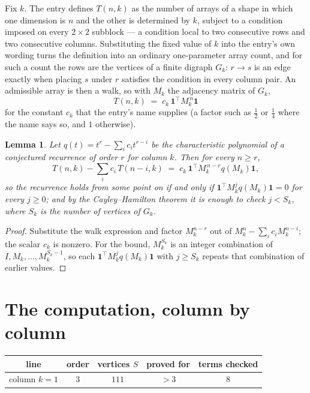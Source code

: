 \documentclass[11pt,a4paper]{article}
\theoremstyle{plain}
\newtheorem{lemma}[theorem]{Lemma}
\theoremstyle{definition}
\begin{document}
Fix $k$. The entry defines $T(n,k)$ as the number of arrays of a shape in which one dimension
is $n$ and the other is determined by $k$, subject to a condition imposed on every
$2\times2$ subblock --- a condition local to two consecutive rows and two consecutive columns.
Substituting the fixed value of $k$ into the entry's own wording turns the definition into an
ordinary one-parameter array count, and for such a count the rows are the vertices of a finite
digraph $G_k$: $r\to s$ is an edge exactly when placing $s$ under $r$ satisfies the condition
in every column pair. An admissible array is then a walk, so with $M_k$ the adjacency matrix
of $G_k$,
\[
T(n,k)\;=\;c_k\,\mathbf{1}^{\!\top}M_k^{\,n}\mathbf{1}
\]
for the constant $c_k$ that the entry's name supplies (a factor such as $\tfrac12$ or
$\tfrac14$ where the name says so, and $1$ otherwise).

\begin{lemma}\label{lem:crit}
Let $q(t)=t^{r}-\sum_i c_it^{r-i}$ be the characteristic polynomial of a conjectured
recurrence of order $r$ for column $k$. Then for every $n\ge r$,
\[
T(n,k)-\sum_i c_i\,T(n-i,k)\;=\;c_k\,\mathbf{1}^{\!\top}M_k^{\,n-r}q(M_k)\mathbf{1},
\]
so the recurrence holds from some point on if and only if
$\mathbf{1}^{\!\top}M_k^{j}q(M_k)\mathbf{1}=0$ for every $j\ge0$; and by the
Cayley--Hamilton theorem it is enough to check $j<S_k$, where $S_k$ is the number of vertices
of $G_k$.
\end{lemma}

\begin{proof}
Substitute the walk expression and factor $M_k^{n-r}$ out of $M_k^{n}-\sum_ic_iM_k^{n-i}$;
the scalar $c_k$ is nonzero. For the bound, $M_k^{S_k}$ is an integer combination of
$I,M_k,\dots,M_k^{S_k-1}$, so each $\mathbf{1}^{\!\top}M_k^{j}q(M_k)\mathbf{1}$ with
$j\ge S_k$ repeats that combination of earlier values.
\end{proof}

\section{The computation, column by column}

\begin{center}
\begin{tabular}{ccccc}
line & order & vertices $S$ & proved for & terms checked \\ \hline
column $k$$=1$ & $3$ & $111$ & $>3$ & $8$ \\
\end{tabular}
\end{center}
\end{document}
